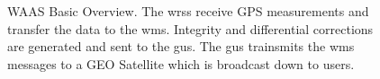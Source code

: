 \begin{figure}
	\centering
	\caption{WAAS Basic Overview. The \acp{wrs} receive GPS measurements and transfer the data to the \ac{wms}. Integrity and differential corrections are generated and sent to the \ac{gus}.  The \ac{gus} trainsmits the \ac{wms} messages to a GEO Satellite which is broadcast down to users.
  }
	\label{fig:How-WAAS-Works}
\end{figure}

